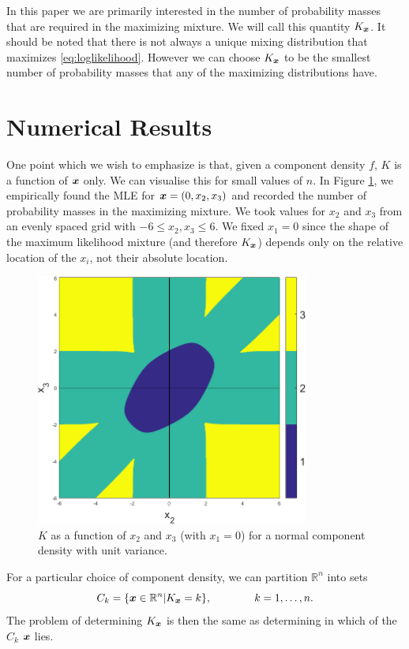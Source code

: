 	In this paper we are primarily interested in the number of probability masses that are required in the maximizing mixture. We will call this quantity $K_{{\bm{{x}}}}$. It should be noted that there is not always a unique mixing distribution that maximizes \eqref{eq:loglikelihood}. However we can choose $K_{{\bm{{x}}}}$ to be the smallest number of probability masses that any of the maximizing distributions have.

\section{Numerical Results}
		One point which we wish to emphasize is that, given a component density $f$, $K$ is a function of ${\bm{{x}}}$ only. We can visualise this for small values of $n$. In Figure \ref{fig:n3phase}, we empirically found the MLE for ${\bm{{x}}} = (0,x_2,x_3)$ and recorded the number of probability masses in the maximizing mixture. We took values for $x_2$ and $x_3$ from an evenly spaced grid with $-6\leq x_2,x_3\leq 6$. We fixed $x_1 = 0$ since the shape of the maximum likelihood mixture (and therefore $K_{{\bm{{x}}}}$) depends only on the relative location of the $x_i$, not their absolute location.
		
		\begin{figure}[ht]
			\centering
			\includegraphics[width=0.8\textwidth]{Sigma1n3res1024width6}
			\caption{$K$ as a function of $x_2$ and $x_3$ (with $x_1 = 0$) for a normal component density with unit variance.}\label{fig:n3phase}
		\end{figure}
		
		For a particular choice of component density, we can partition $\mathbb{R}^n$ into sets 
		\begin{equation}
			C_k = \{ {\bm{{x}}} \in \mathbb{R}^n | K_{{\bm{{x}}}} = k \}, \hspace{40pt} k = 1,\dots,n.
		\end{equation}
		The problem of determining $K_{{\bm{{x}}}}$ is then the same as determining in which of the $C_k$ ${\bm{{x}}}$ lies.

